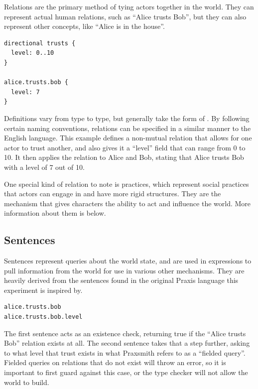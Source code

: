 Relations are the primary method of tying actors together in the world. They can
represent actual human relations, such as “Alice trusts Bob”, but they can also
represent other concepts, like “Alice is in the house”.

\begin{lstlisting}[float=hb, caption=Example of defining and applying a new relation type., label=lst:RelationDef]
directional trusts {
  level: 0..10
}

alice.trusts.bob {
  level: 7
}
\end{lstlisting}

Definitions vary from type to type, but generally take the form of .
By following certain naming conventions, relations can be specified in a similar manner
to the English language. This example defines a non-mutual relation that allows for one actor to
trust another, and also gives it a ``level'' field that can range from 0 to 10. It then applies
the relation to Alice and Bob, stating that Alice trusts Bob with a level of 7 out of 10.

One special kind of relation to note is practices, which represent social practices that actors
can engage in and have more rigid structures. They are the mechanism that gives characters the
ability to act and influence the world. More information about them is below.

\subsection{Sentences}

Sentences represent queries about the world state, and are used in expressions to pull
information from the world for use in various other mechanisms. They are heavily
derived from the sentences found in the original Praxis language this experiment is
inspired by. \cite{evans_ai_2015}

\begin{lstlisting}[float=hb, caption=Example of two sentences that query Alice's trust of Bob., label=lst:Sentence]
alice.trusts.bob
alice.trusts.bob.level
\end{lstlisting}

The first sentence acts as an existence check, returning true if the ``Alice trusts Bob''
relation exists at all. The second sentence takes that a step further, asking to what
level that trust exists in what Praxsmith refers to as a ``fielded query''. Fielded queries
on relations that do not exist will throw an error, so it is important to first guard
against this case, or the type checker will not allow the world to build.

